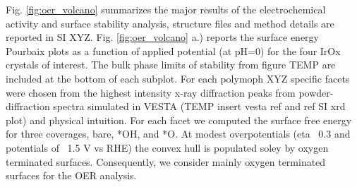 Fig. \ref{fig:oer_volcano} summarizes the major results of the electrochemical activity and surface stability analysis, structure files and method details are reported in SI XYZ.
%
Fig. \ref{fig:oer_volcano} a.) reports the surface energy Pourbaix plots as a function of applied potential (at pH=0) for the four IrOx crystals of interest.
%
The bulk phase limits of stability from figure TEMP are included at the bottom of each subplot.
%
For each polymoph XYZ specific facets were chosen from the highest intensity x-ray diffraction peaks from powder-diffraction spectra simulated in VESTA (TEMP insert vesta ref and ref SI xrd plot) and physical intuition.
%
For each facet we computed the surface free energy for three coverages, bare, *OH, and *O.
%
At modest overpotentials (eta ~0.3 and potentials of ~1.5 V vs RHE) the convex hull is populated soley by oxygen terminated surfaces.
%
Consequently, we consider mainly oxygen terminated surfaces for the OER analysis.
%

